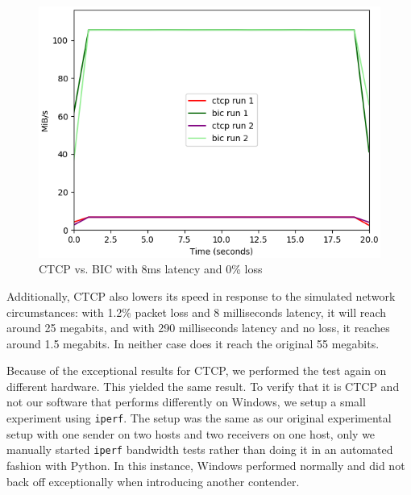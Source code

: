 \documentclass{article}
\begin{document}
\begin{figure}[H]
	\centering
		\includegraphics[scale=0.55]{figs/ctcp-bic-8-0.png}
		\caption{CTCP vs. BIC with 8ms latency and 0\% loss}
	\label{fig:ctcp-1}
\end{figure}

Additionally, CTCP also lowers its speed in response to the simulated network
circumstances: with 1.2\% packet loss and 8 milliseconds latency, it will reach
around 25 megabits, and with 290 milliseconds latency and no loss, it reaches
around 1.5 megabits. In neither case does it reach the original 55 megabits.

Because of the exceptional results for CTCP, we performed the test again on
different hardware. This yielded the same result. To verify that it is CTCP and
not our software that performs differently on Windows, we setup a small
experiment using \texttt{iperf}. The setup was the same as our original
experimental setup with one sender on two hosts and two receivers on one host,
only we manually started \texttt{iperf} bandwidth tests rather than doing it in
an automated fashion with Python. In this instance, Windows performed normally
and did not back off exceptionally when introducing another contender.

\end{document}
